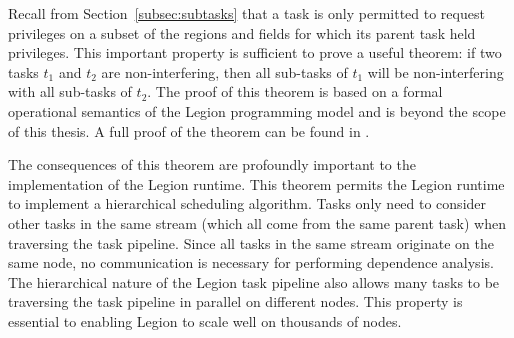 Recall from Section~\ref{subsec:subtasks} that a 
task is only permitted to request privileges on 
a subset of the regions and fields for which its
parent task held privileges. This important property
is sufficient to prove a useful theorem: if two tasks
$t_1$ and $t_2$ are non-interfering, then all 
sub-tasks of $t_1$ will be non-interfering with all
sub-tasks of $t_2$.  The proof of this theorem is
based on a formal operational semantics of the Legion
programming model and is beyond the scope of this
thesis.  A full proof of the theorem can be found in
\cite{LegionTypes13}.  

The consequences of this theorem are profoundly
important to the implementation of the Legion runtime.
This theorem permits the Legion runtime to 
implement a hierarchical scheduling algorithm.
Tasks only need to consider other tasks in the
same stream (which all come from the same parent 
task) when traversing the task pipeline. 
Since all tasks in the same stream originate on 
the same node, no communication is 
necessary for performing dependence analysis. 
The hierarchical nature of the Legion task pipeline 
also allows many tasks to be traversing the task 
pipeline in parallel on different nodes. This 
property is essential to enabling Legion to scale 
well on thousands of nodes.

